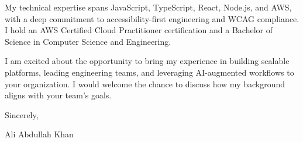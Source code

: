 \documentclass[letterpaper,11pt]{article}
\begin{document}
\vspace{8pt}

My technical expertise spans JavaScript, TypeScript, React, Node.js, and AWS, with a deep commitment to accessibility-first engineering and WCAG compliance. I hold an AWS Certified Cloud Practitioner certification and a Bachelor of Science in Computer Science and Engineering.

\vspace{8pt}

I am excited about the opportunity to bring my experience in building scalable platforms, leading engineering teams, and leveraging AI-augmented workflows to your organization. I would welcome the chance to discuss how my background aligns with your team's goals.

\vspace{16pt}

Sincerely,

\vspace{4pt}

Ali Abdullah Khan
\end{document}
